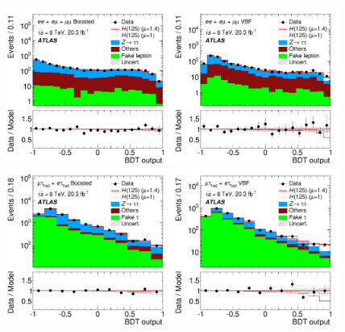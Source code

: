 \begin{figure}[tp]
  \centering
  \includegraphics[width=0.48\textwidth]{figures/HIGG-2013-32/fig_08b}
  \includegraphics[width=0.48\textwidth]{figures/HIGG-2013-32/fig_08a}
  \includegraphics[width=0.48\textwidth]{figures/HIGG-2013-32/fig_08d}
  \includegraphics[width=0.48\textwidth]{figures/HIGG-2013-32/fig_08c}

\end{figure}
